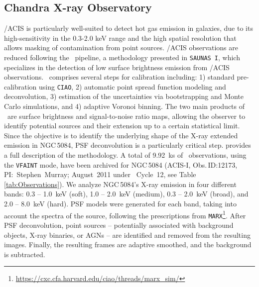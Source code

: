 \documentclass[modern]{CORE-AAS/aastex631}
\begin{document}
\subsection{Chandra X-ray Observatory} \label{sec:data_chandra}
\Chandra/ACIS is particularly well-suited to detect hot gas emission in galaxies, due to its high-sensitivity in the 0.3-2.0 keV range and the high spatial resolution that allows masking of contamination from point sources. \Chandra/ACIS observations are reduced following the \SAUNAS\ pipeline, a methodology presented in \texttt{SAUNAS I}, which specializes in the detection of low surface brightness emission from \Chandra/ACIS observations. \SAUNAS\ comprises several steps for calibration including: 1) standard pre-calibration using \texttt{CIAO}, 2) automatic point spread function modeling and deconvolution, 3) estimation of the uncertainties via bootstrapping and Monte Carlo simulations, and 4) adaptive Voronoi binning.
The two main products of \SAUNAS\ are surface brightness and signal-to-noise ratio maps, allowing the observer to identify potential sources and their extension up to a certain statistical limit. Since the objective is to identify the underlying shape of the X-ray extended emission in NGC\,5084, PSF deconvolution is a particularly critical step. \citet{borlaff+2024apj967_169} provides a full description of the methodology.
A total of 9.92~ks of \Chandra\ observations, using the \texttt{VFAINT} mode, have been archived for NGC\,5084 (ACIS-I, Obs.\,ID:12173, PI:~Stephen~Murray; August~2011 under \Chandra\ Cycle~12, see Table \ref{tab:Observations}). We analyze NGC\,5084's X-ray emission in four different bands: 0.3 -- 1.0~keV (soft), 1.0 -- 2.0~keV (medium), 0.3 -- 2.0~keV (broad), and 2.0 -- 8.0~keV (hard). PSF models were generated for each band, taking into account the spectra of the source, following the prescriptions from \texttt{MARX}\footnote{\url{https://cxc.cfa.harvard.edu/ciao/threads/marx_sim/}}. After PSF deconvolution, point sources -- potentially associated with background objects, X-ray binaries, or AGNs -- are identified and removed from the resulting images. Finally, the resulting frames are adaptive smoothed, and the background is subtracted. 
\end{document}
